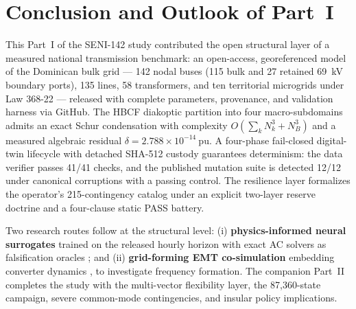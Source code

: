 \section{Conclusion and Outlook of Part~I}
\label{sec:conclusion}

This Part~I of the SENI-142 study contributed the open structural layer of a measured national transmission benchmark: an open-access, georeferenced model of the Dominican bulk grid --- 142 nodal buses (115 bulk and 27 retained 69~kV boundary ports), 135 lines, 58 transformers, and ten territorial microgrids under Law 368-22 --- released with complete parameters, provenance, and validation harness via GitHub. The HBCF diakoptic partition into four macro-subdomains admits an exact Schur condensation with complexity $O(\sum_k N_k^3 + N_B^3)$ and a measured algebraic residual $\delta = 2.788 \times 10^{-14}\ \mathrm{pu}$. A four-phase fail-closed digital-twin lifecycle with detached SHA-512 custody guarantees determinism: the data verifier passes 41/41 checks, and the published mutation suite is detected 12/12 under canonical corruptions with a passing control. The resilience layer formalizes the operator's 215-contingency catalog under an explicit two-layer reserve doctrine and a four-clause static PASS battery.

Two research routes follow at the structural level: (i) \textbf{physics-informed neural surrogates} trained on the released hourly horizon with exact AC solvers as falsification oracles \cite{misyris2020}; and (ii) \textbf{grid-forming EMT co-simulation} embedding converter dynamics \cite{rosso2021}, \cite{ieee2800} to investigate frequency formation. The companion Part~II~\cite{seni142part2} completes the study with the multi-vector flexibility layer, the 87,360-state campaign, severe common-mode contingencies, and insular policy implications.
